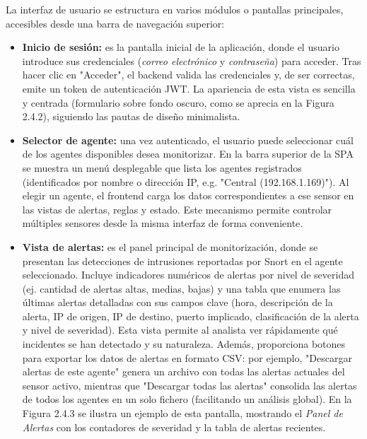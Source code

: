 \documentclass[11pt,a4paper,twoside]{report}
\begin{document}
La interfaz de usuario se estructura en varios módulos o pantallas principales, accesibles desde una barra de navegación superior:\newline

\begin{itemize}
	\item \textbf{Inicio de sesión:} es la pantalla inicial de la aplicación, donde el usuario introduce sus credenciales (\emph{correo electrónico} y \emph{contraseña}) para acceder. Tras hacer clic en "Acceder", el backend valida las credenciales y, de ser correctas, emite un token de autenticación JWT. La apariencia de esta vista es sencilla y centrada (formulario sobre fondo oscuro, como se aprecia en la Figura 2.4.2), siguiendo las pautas de diseño minimalista.
	
	\item \textbf{Selector de agente:} una vez autenticado, el usuario puede seleccionar cuál de los agentes disponibles desea monitorizar. En la barra superior de la SPA se muestra un menú desplegable que lista los agentes registrados (identificados por nombre o dirección IP, e.g. "Central (192.168.1.169)"). Al elegir un agente, el frontend carga los datos correspondientes a ese sensor en las vistas de alertas, reglas y estado. Este mecanismo permite controlar múltiples sensores desde la misma interfaz de forma conveniente.
	
	\item \textbf{Vista de alertas:} es el panel principal de monitorización, donde se presentan las detecciones de intrusiones reportadas por Snort en el agente seleccionado. Incluye indicadores numéricos de alertas por nivel de severidad (ej. cantidad de alertas altas, medias, bajas) y una tabla que enumera las últimas alertas detalladas con sus campos clave (hora, descripción de la alerta, IP de origen, IP de destino, puerto implicado, clasificación de la alerta y nivel de severidad). Esta vista permite al analista ver rápidamente qué incidentes se han detectado y su naturaleza. Además, proporciona botones para exportar los datos de alertas en formato CSV: por ejemplo, "Descargar alertas de este agente" genera un archivo con todas las alertas actuales del sensor activo, mientras que "Descargar todas las alertas" consolida las alertas de todos los agentes en un solo fichero (facilitando un análisis global). En la Figura 2.4.3 se ilustra un ejemplo de esta pantalla, mostrando el \emph{Panel de Alertas} con los contadores de severidad y la tabla de alertas recientes.
	

\end{itemize}
\end{document}
